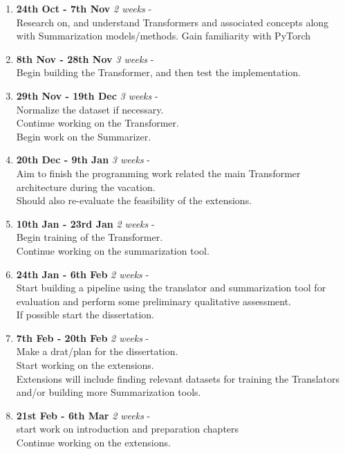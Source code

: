 \documentclass[12pt, a4paper]{article}
\begin{document}
\begin{enumerate}
  \item {\textbf{24th Oct - 7th Nov}} \textit{2 weeks}  -\\ Research on, and understand Transformers and associated concepts along with Summarization models/methods. Gain familiarity with PyTorch
  
  \item \textbf{{8th Nov - 28th Nov}} \textit{3 weeks}   -\\
  Begin building the Transformer, and then test the implementation.
  
  \item \textbf{{29th Nov - 19th Dec}} \textit{3 weeks}   -\\
  Normalize the dataset if necessary. \\
  Continue working on the Transformer. \\
  Begin work on the Summarizer.
  
  \item \textbf{{20th Dec - 9th Jan}} \textit{3 weeks}  -\\ 
  Aim to finish the programming work related the main Transformer architecture during the vacation.\\ 
  Should also re-evaluate the feasibility of the extensions.
  
  \item \textbf{{10th Jan - 23rd Jan}} \textit{2 weeks}   -\\
  Begin training of the Transformer. \\ Continue working on the summarization tool.
  
  \item \textbf{{24th Jan - 6th Feb}} \textit{2 weeks}   -\\
  Start building a pipeline using the translator and summarization tool for evaluation and perform some preliminary qualitative assessment. \\
   If possible start the dissertation.
  
  \item \textbf{{7th Feb - 20th Feb}} \textit{2 weeks}   -\\
  Make a drat/plan for the dissertation. \\ 
  Start working on the extensions. \\
  Extensions will include finding relevant datasets for training the Translators and/or building more Summarization tools.
  
  \item \textbf{{21st Feb - 6th Mar}} \textit{2 weeks}  -\\
  start work on introduction and preparation chapters\\
  Continue working on the extensions.
  

\end{enumerate}
\end{document}
